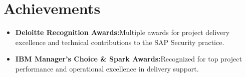 \documentclass[10pt]{article}
\begin{document}
\section{Achievements}
\begin{itemize}
	\small
		\item \textbf {Deloitte Recognition Awards:}Multiple awards for project delivery excellence and technical contributions to the SAP Security practice.
		\item \textbf {IBM Manager’s Choice \& Spark Awards:}Recognized for top project performance and operational excellence in delivery support.
\end{itemize}
\end{document}

